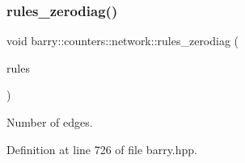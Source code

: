 \subsubsection{\texorpdfstring{rules\+\_\+zerodiag()}{rules\_zerodiag()}}
{\footnotesize\ttfamily void barry\+::counters\+::network\+::rules\+\_\+zerodiag (\begin{DoxyParamCaption}\item[{\hyperlink{namespacebarry_1_1counters_1_1network_adbdb20b3ce883777da2364984ea10c56}{Net\+Rules} $\ast$}]{rules }\end{DoxyParamCaption})\hspace{0.3cm}{\ttfamily [inline]}}



Number of edges. 



Definition at line 726 of file barry.\+hpp.

